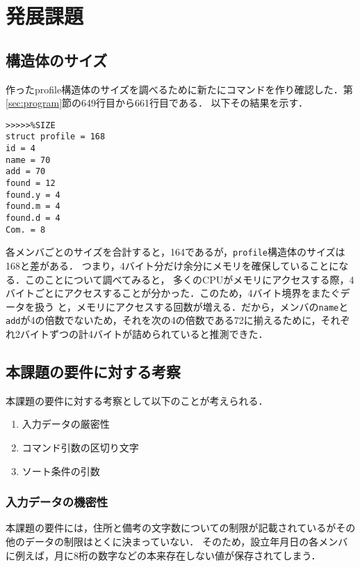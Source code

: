 \documentclass[a4j,11pt]{jarticle}
\begin{document}
\section{発展課題}\label{sec:hatten}
\subsection{構造体のサイズ}
作ったprofile構造体のサイズを調べるために新たにコマンドを作り確認した．第\ref{sec:program}節の649行目から661行目である．
以下その結果を示す．
\begin{verbatim}
>>>>>%SIZE
struct profile = 168
id = 4
name = 70
add = 70
found = 12
found.y = 4
found.m = 4
found.d = 4
Com. = 8
\end{verbatim}
各メンバごとのサイズを合計すると，164であるが，\verb|profile|構造体のサイズは168と差がある．
つまり，4バイト分だけ余分にメモリを確保していることになる．このことについて調べてみると，
多くのCPUがメモリにアクセスする際，4バイトごとにアクセスすることが分かった．このため，4バイト境界をまたぐデータを扱う
と，メモリにアクセスする回数が増える．だから，メンバの\verb|name|と\verb|add|が4の倍数でないため，それを次の4の倍数である72に揃えるために，それぞれ2バイトずつの計4バイトが詰められていると推測できた．
\subsection{本課題の要件に対する考察}
本課題の要件に対する考察として以下のことが考えられる．
\begin{enumerate}
\setlength{\parskip}{2pt} \setlength{\itemsep}{2pt}
 \item 入力データの厳密性
 \item コマンド引数の区切り文字
 \item ソート条件の引数
\end{enumerate}
\subsubsection{入力データの機密性}
本課題の要件には，住所と備考の文字数についての制限が記載されているがその他のデータの制限はとくに決まっていない．
そのため，設立年月日の各メンバに例えば，月に8桁の数字などの本来存在しない値が保存されてしまう．
\end{document}
